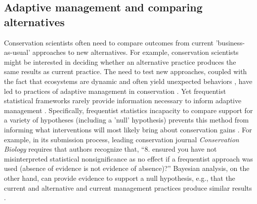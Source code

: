 \documentclass{article}
\begin{document}
\subsection*{Adaptive management and comparing alternatives}
\par Conservation scientists often need to compare outcomes from current 'business-as-usual' approaches to new alternatives. For example, conservation scientists might be interested in deciding whether an alternative practice produces the same results as current practice. 
The need to test new approaches, coupled with the fact that ecosystems are dynamic and often yield unexpected behaviors \citep{Levin2012,Gross2013}, have led to practices of adaptive management in conservation \citep{holling1978adaptive}. Yet frequentist statistical frameworks rarely provide information necessary to inform adaptive management  \citep{prato2005bayesian}.  Specifically, frequentist statistics incapacity to compare support for a variety of hypotheses (including a 'null' hypothesis) prevents this method from informing what interventions will most likely bring about conservation gains \citep{prato2005bayesian}. For example, in its submission process, leading conservation journal \textit{Conservation Biology} requires that authors recognize that, ``8. ensured you have not misinterpreted statistical nonsignificance as no effect if a frequentist approach was used (absence of evidence is not evidence of absence)?'' Bayesian analysis, on the other hand, can provide evidence to support a null hypothesis, e.g., that the current and alternative and current management practices produce similar results \citep{gallistel2009importance}.
\end{document}
